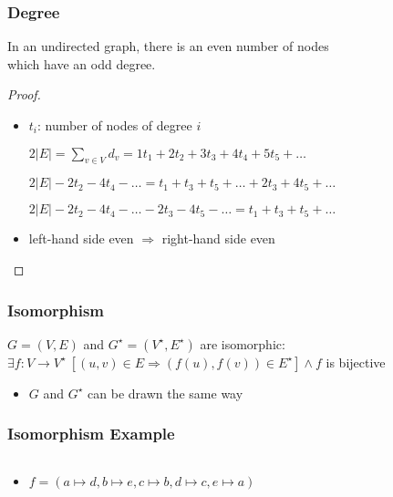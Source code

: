 \documentclass[dvipsnames]{beamer}
\begin{document}
\begin{frame}
  \frametitle{Degree}

  \begin{theorem}
    In an undirected graph, there is an even number of nodes\\
    which have an odd degree.
  \end{theorem}

  \pause
  \begin{proof}
    \begin{itemize}
      \item $t_i$: number of nodes of degree $i$

      \pause
$2|E| = \sum_{v \in V} d_v = 1t_1 + 2t_2 + 3t_3 + 4t_4 + 5t_5 + \dots$

\pause
$2|E| - 2t_2 - 4t_4 - \dots = t_1 + t_3 + t_5 + \dots + 2t_3 + 4t_5 + \dots$

\pause
$2|E| - 2t_2 - 4t_4 - \dots - 2t_3 - 4t_5 - \dots = t_1 + t_3 + t_5 + \dots$

      \pause
      \item left-hand side even $\Rightarrow$ right-hand side even
    \end{itemize}
  \end{proof}
\end{frame}

\begin{frame}
  \frametitle{Isomorphism}

  \begin{definition}
    $G=(V,E)$ and $G^\star=(V^\star,E^\star)$ are \alert{isomorphic}:\\
      $\exists f: V \rightarrow V^\star~[(u,v) \in E \Rightarrow (f(u),f(v)) \in E^\star] \wedge
      f$ is bijective
  \end{definition}

  \pause
  \begin{itemize}
    \item $G$ and $G^\star$ can be drawn the same way
  \end{itemize}
\end{frame}

\begin{frame}
  \frametitle{Isomorphism Example}

  \begin{columns}
    \begin{center}
    \end{center}

    \begin{center}
    \end{center}
  \end{columns}

  \pause
  \bigskip
  \begin{itemize}
    \item $f = (a \mapsto d, b \mapsto e, c \mapsto b, d \mapsto c,
      e \mapsto a)$
  \end{itemize}
\end{frame}
\end{document}
